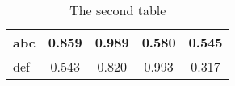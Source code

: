 \begin{longtable}{l|SSSS}
\caption{The second table}\label{}\\
\toprule

abc	&0.859	&0.989	&0.580	&0.545	\\\hline

def	&0.543	&0.820	&0.993	&0.317	\\

\bottomrule
\end{longtable}